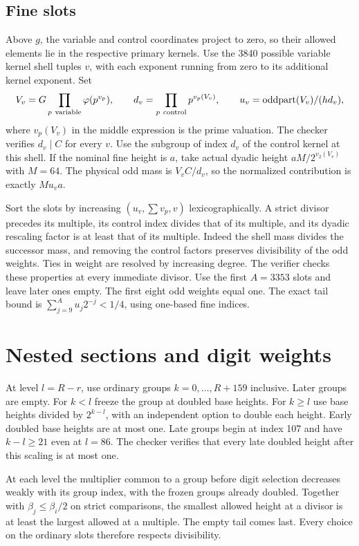 \subsection{Fine slots}\label{fine-slots}

Above \(g\), the variable and control coordinates project to zero, so their allowed elements lie in the respective primary kernels. Use the 3840 possible variable kernel shell tuples \(v\), with each exponent running from zero to its additional kernel exponent. Set \[
 V_v=G\prod_{p\ {\rm variable}}\varphi(p^{v_p}),\qquad
 d_v=\prod_{p\ {\rm control}}p^{v_p(V_v)},\qquad
 u_v=\operatorname{oddpart}(V_v)/(h d_v),
\] where \(v_p(V_v)\) in the middle expression is the prime valuation. The checker verifies \(d_v\mid C\) for every \(v\). Use the subgroup of index \(d_v\) of the control kernel at this shell. If the nominal fine height is \(a\), take actual dyadic height \(aM/2^{v_2(V_v)}\) with \(M=64\). The physical odd mass is \(V_vC/d_v\), so the normalized contribution is exactly \(M u_v a\).

Sort the slots by increasing \((u_v,\sum v_p,v)\) lexicographically. A strict divisor precedes its multiple, its control index divides that of its multiple, and its dyadic rescaling factor is at least that of its multiple. Indeed the shell mass divides the successor mass, and removing the control factors preserves divisibility of the odd weights. Ties in weight are resolved by increasing degree. The verifier checks these properties at every immediate divisor. Use the first \(A=3353\) slots and leave later ones empty. The first eight odd weights equal one. The exact tail bound is \(\sum_{j=9}^A u_j2^{-j}<1/4\), using one-based fine indices.

\section{Nested sections and digit weights}\label{h100:nesting}

At level \(l=R-r\), use ordinary groups \(k=0,\ldots,R+159\) inclusive. Later groups are empty. For \(k<l\) freeze the group at doubled base heights. For \(k\ge l\) use base heights divided by \(2^{k-l}\), with an independent option to double each height. Early doubled base heights are at most one. Late groups begin at index 107 and have \(k-l\ge21\) even at \(l=86\). The checker verifies that every late doubled height after this scaling is at most one.

At each level the multiplier common to a group before digit selection decreases weakly with its group index, with the frozen groups already doubled. Together with \(\beta_j\le\beta_i/2\) on strict comparisons, the smallest allowed height at a divisor is at least the largest allowed at a multiple. The empty tail comes last. Every choice on the ordinary slots therefore respects divisibility.

